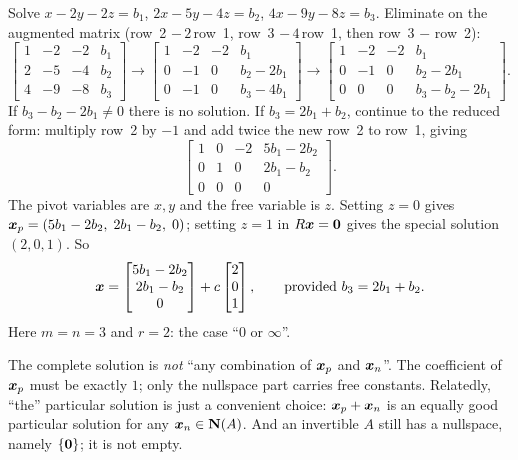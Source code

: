 \begin{example}\label{ex:u09-params}
Solve $x-2y-2z=b_1$, $2x-5y-4z=b_2$, $4x-9y-8z=b_3$. Eliminate on the augmented matrix
(row~2 $-\,2\,$row~1, row~3 $-\,4\,$row~1, then row~3 $-$ row~2):
\[
\left[\begin{array}{ccc|c}1&-2&-2&b_1\\2&-5&-4&b_2\\4&-9&-8&b_3\end{array}\right]\longrightarrow
\left[\begin{array}{ccc|c}1&-2&-2&b_1\\0&-1&0&b_2-2b_1\\0&-1&0&b_3-4b_1\end{array}\right]\longrightarrow
\left[\begin{array}{ccc|c}1&-2&-2&b_1\\0&-1&0&b_2-2b_1\\0&0&0&b_3-b_2-2b_1\end{array}\right].
\]
If $b_3-b_2-2b_1\ne0$ there is no solution. If $b_3=2b_1+b_2$, continue to the reduced form:
multiply row~2 by $-1$ and add twice the new row~2 to row~1, giving
\[
\left[\begin{array}{ccc|c}1&0&-2&5b_1-2b_2\\0&1&0&2b_1-b_2\\0&0&0&0\end{array}\right].
\]
The pivot variables are $x,y$ and the free variable is $z$. Setting $z=0$ gives
$\boldsymbol{x}_p=(5b_1-2b_2,\;2b_1-b_2,\;0)$; setting $z=1$ in $R\boldsymbol{x}=\boldsymbol{0}$ gives the special solution
$(2,0,1)$. So
\[
\boldsymbol{x}=\begin{bmatrix}5b_1-2b_2\\2b_1-b_2\\0\end{bmatrix}+c\begin{bmatrix}2\\0\\1\end{bmatrix},
\qquad\text{provided } b_3=2b_1+b_2.
\]
Here $m=n=3$ and $r=2$: the case ``$0$ or $\infty$''.
\end{example}

\begin{trap}
The complete solution is \emph{not} ``any combination of $\boldsymbol{x}_p$ and $\boldsymbol{x}_n$''. The
coefficient of $\boldsymbol{x}_p$ must be exactly $1$; only the nullspace part carries free constants.
Relatedly, ``the'' particular solution is just a convenient choice: $\boldsymbol{x}_p+\boldsymbol{x}_n$ is an
equally good particular solution for any $\boldsymbol{x}_n\in\mathbf{N}(A)$. And an invertible $A$ still has a
nullspace, namely $\{\boldsymbol{0}\}$; it is not empty.
\end{trap}

